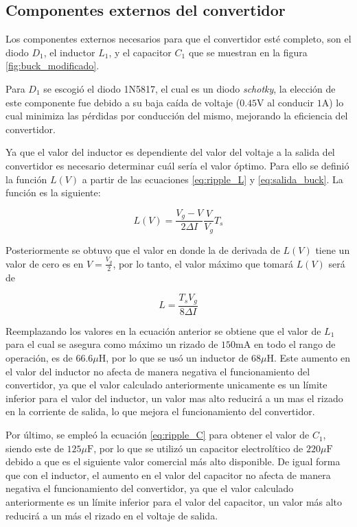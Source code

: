     \subsection{Componentes externos del convertidor}

        Los componentes externos necesarios para que el convertidor esté completo, son el 
        diodo $D_1$, el inductor $L_1$, y el capacitor $C_1$ que se muestran en la figura
        \ref{fig:buck_modificado}.

        Para $D_1$ se escogió el diodo 1N5817, el cual es un diodo \textit{
        schotky}, la elección de este componente fue debido a su baja caída de voltaje
        ($0.45\text{V}$ al conducir $1\text{A}$) lo cual minimiza las pérdidas por 
        conducción del mismo, mejorando la eficiencia del convertidor.

        Ya que el valor del inductor es dependiente
        del valor del voltaje a la salida del convertidor es necesario determinar cuál
        sería el valor óptimo. Para ello se definió la función $L(V)$ a partir de las 
        ecuaciones \ref{eq:ripple_L} y \ref{eq:salida_buck}. La función es la siguiente: 

        \begin{equation}
            L(V) = \frac{V_g - V}{2\Delta I}\frac{V}{V_g} T_s
            \label{eq:L_function}
        \end{equation}

        Posteriormente se obtuvo que el valor en
        donde la de derivada de $L(V)$ tiene un valor de cero es en $V = \frac{V_g}{2}$,
        por lo tanto, el valor máximo que tomará $L(V)$ será de 

        $$ L =  \frac{T_sV_g}{8\Delta I}$$
        
        Reemplazando los valores en la ecuación anterior se obtiene que el valor de 
        $L_1$ para el cual se asegura como máximo un rizado de $150 \text{mA}$ en 
        todo el rango de operación, es de $66.6 \mu \text{H}$, por lo que se usó un
        inductor de $68 \mu \text{H}$. Este aumento en el valor del inductor no afecta
        de manera negativa el funcionamiento del convertidor, ya que el valor calculado
        anteriormente unicamente es un límite inferior para el valor del inductor, un 
        valor mas alto reducirá a un mas el rizado en la corriente de salida, lo que 
        mejora el funcionamiento del convertidor.

        Por último, se empleó la ecuación \ref{eq:ripple_C} para obtener el valor 
        de $C_1$, siendo este de $125 \mu\text{F}$, por lo que se utilizó un capacitor
        electrolítico de $220 \mu\text{F}$ debido a que es el siguiente valor comercial 
        más alto disponible. De igual forma que con el inductor, el
        aumento en el valor del capacitor no afecta de manera negativa el funcionamiento
        del convertidor, ya que el valor calculado anteriormente es un límite inferior
        para el valor del capacitor, un valor más alto reducirá a un más el rizado en
        el voltaje de salida.

